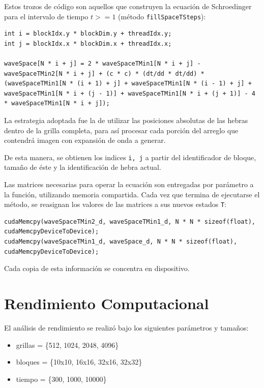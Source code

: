 \documentclass[jou]{apa6}
\begin{document}
Estos trozos de código son aquellos que construyen la ecuación de Schroedinger para el intervalo de tiempo $t >= 1$ (método \texttt{fillSpaceTSteps}):

\lstset{language=C, breaklines=true, frame=single}

\begin{lstlisting}
int i = blockIdx.y * blockDim.y + threadIdx.y;
int j = blockIdx.x * blockDim.x + threadIdx.x;

waveSpace[N * i + j] = 2 * waveSpaceTMin1[N * i + j] - waveSpaceTMin2[N * i + j] + (c * c) * (dt/dd * dt/dd) * (waveSpaceTMin1[N * (i + 1) + j] + waveSpaceTMin1[N * (i - 1) + j] + waveSpaceTMin1[N * i + (j - 1)] + waveSpaceTMin1[N * i + (j + 1)] - 4 * waveSpaceTMin1[N * i + j]);
\end{lstlisting}

La estrategia adoptada fue la de utilizar las posiciones absolutas de las hebras dentro de la grilla completa, para así procesar cada porción del arreglo que contendrá imagen con expansión de onda a generar.

De esta manera, se obtienen los indices \texttt{i, j} a partir del identificador de bloque, tamaño de éste y la identificación de hebra actual.

Las matrices necesarias para operar la ecuación son entregadas por parámetro a la función, utilizando memoria compartida. Cada vez que termina de ejecutarse el método, se reasignan los valores de las matrices a sus nuevos estados \texttt{T}:

\lstset{language=C, breaklines=true, frame=single}

\begin{lstlisting}
cudaMemcpy(waveSpaceTMin2_d, waveSpaceTMin1_d, N * N * sizeof(float), cudaMemcpyDeviceToDevice);
cudaMemcpy(waveSpaceTMin1_d, waveSpace_d, N * N * sizeof(float), cudaMemcpyDeviceToDevice);
\end{lstlisting}

Cada copia de esta información se concentra en dispositivo.

\section{Rendimiento Computacional}

El análisis de rendimiento se realizó bajo los siguientes parámetros y tamaños:

\begin{itemize}
	\item grillas = \{512, 1024, 2048, 4096\}
	\item bloques = \{10x10, 16x16, 32x16, 32x32\}
	\item tiempo = \{300, 1000, 10000\}
\end{itemize}
\end{document}
